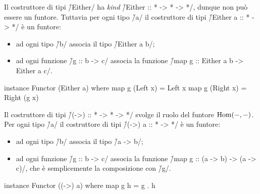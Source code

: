 \begin{frame}[fragile]
Il costruttore di tipi \h/Either/ ha \emph{kind} \h/Either :: * -> * -> */, dunque non può essere un funtore. Tuttavia per ogni tipo \h/a/ il costruttore di tipi \h/Either a :: * -> */ è un funtore:
\begin{itemize}
\item ad ogni tipo \h/b/ associa il tipo \h/Either a b/;
\item ad ogni funzione \h/g :: b -> c/ associa la funzione \h/map g :: Either a b -> Either a c/.
\end{itemize}

\begin{haskellcode}
instance Functor (Either a) where
    map g (Left x) = Left x
    map g (Right x) = Right (g x)
\end{haskellcode}
\end{frame}


\begin{frame}[fragile]
Il costruttore di tipi \h/(->) :: * -> * -> */ svolge il ruolo del funtore $\operatorname{Hom}(-,-)$. Per ogni tipo \h/a/ il costruttore di tipi \h/(->) a :: * -> */ è un funtore:
\begin{itemize}
\item ad ogni tipo \h/b/ associa il tipo \h/a -> b/;
\item ad ogni funzione \h/g :: b -> c/ associa la funzione \h/map g :: (a -> b) -> (a -> c)/, che è semplicemente la composizione con \h/g/.
\end{itemize}

\begin{haskellcode}
instance Functor ((->) a) where
    map g h = g . h
\end{haskellcode}
\end{frame}